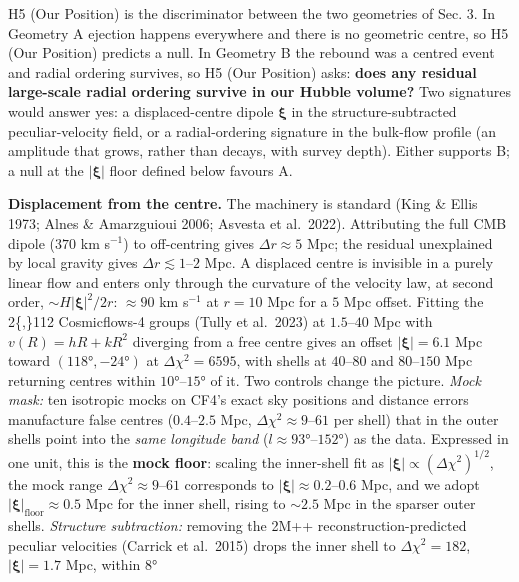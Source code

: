 \documentclass[
]{article}
\begin{document}
H5 (Our Position) is the discriminator between the two geometries of
Sec. 3. In Geometry A ejection happens everywhere and there is no
geometric centre, so H5 (Our Position) predicts a null. In Geometry B
the rebound was a centred event and radial ordering survives, so H5 (Our
Position) asks: \textbf{does any residual large-scale radial ordering
survive in our Hubble volume?} Two signatures would answer yes: a
displaced-centre dipole \(\boldsymbol{\xi}\) in the structure-subtracted
peculiar-velocity field, or a radial-ordering signature in the bulk-flow
profile (an amplitude that grows, rather than decays, with survey
depth). Either supports B; a null at the \(|\boldsymbol{\xi}|\) floor
defined below favours A.

\textbf{Displacement from the centre.} The machinery is standard (King
\& Ellis 1973; Alnes \& Amarzguioui 2006; Asvesta et al.~2022).
Attributing the full CMB dipole (\(370\) km s\(^{-1}\)) to off-centring
gives \(\Delta r \approx 5\) Mpc; the residual unexplained by local
gravity gives \(\Delta r \lesssim 1\)--\(2\) Mpc. A displaced centre is
invisible in a purely linear flow and enters only through the curvature
of the velocity law, at second order, \(\sim H|\boldsymbol{\xi}|^2/2r\):
\(\approx 90\) km s\(^{-1}\) at \(r = 10\) Mpc for a \(5\) Mpc offset.
Fitting the 2\{,\}112 Cosmicflows-4 groups (Tully et al.~2023) at
\(1.5\)--\(40\) Mpc with \(v(R) = hR + kR^2\) diverging from a free
centre gives an offset \(|\boldsymbol{\xi}| = 6.1\) Mpc toward
\((118°, -24°)\) at \(\Delta\chi^2 = 6595\), with shells at
\(40\)--\(80\) and \(80\)--\(150\) Mpc returning centres within
\(10°\)--\(15°\) of it. Two controls change the picture. \emph{Mock
mask:} ten isotropic mocks on CF4's exact sky positions and distance
errors manufacture false centres (\(0.4\)--\(2.5\) Mpc,
\(\Delta\chi^2 \approx 9\)--\(61\) per shell) that in the outer shells
point into the \emph{same longitude band} (\(l \approx 93°\)--\(152°\))
as the data. Expressed in one unit, this is the \textbf{mock floor}:
scaling the inner-shell fit as
\(|\boldsymbol{\xi}| \propto (\Delta\chi^2)^{1/2}\), the mock range
\(\Delta\chi^2 \approx 9\)--\(61\) corresponds to
\(|\boldsymbol{\xi}| \approx 0.2\)--\(0.6\) Mpc, and we adopt
\(|\boldsymbol{\xi}|_{\text{floor}} \approx 0.5\) Mpc for the inner
shell, rising to \(\sim\!2.5\) Mpc in the sparser outer shells.
\emph{Structure subtraction:} removing the 2M++ reconstruction-predicted
peculiar velocities (Carrick et al.~2015) drops the inner shell to
\(\Delta\chi^2 = 182\), \(|\boldsymbol{\xi}| = 1.7\) Mpc, within \(8°\)
\end{document}
